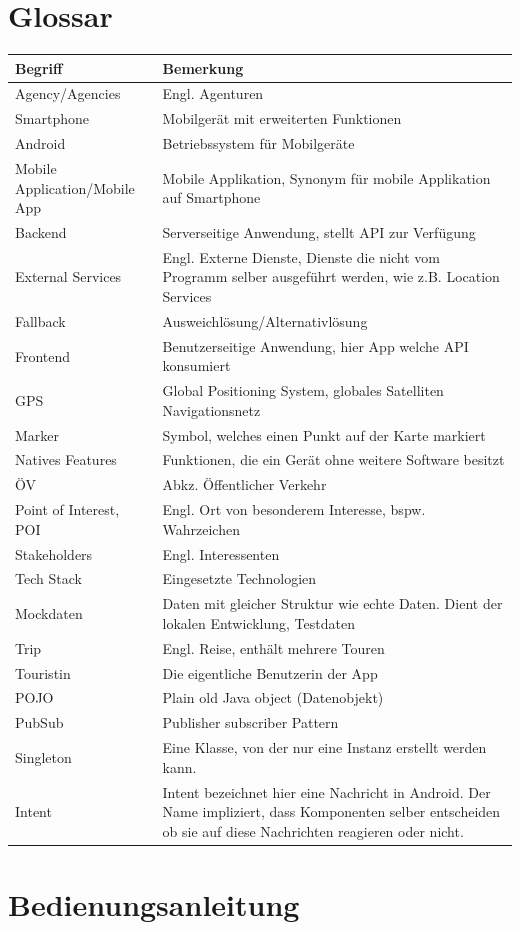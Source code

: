 \documentclass[a4paper,10pt,xetex]{article}
\begin{document}
\section{Glossar}\label{glossar}
\begin{longtabu} to \textwidth { | l | X[l] | }
\hline
\textbf{Begriff} & \textbf{Bemerkung}\\\hline
\endhead

Agency/Agencies & Engl. Agenturen\\\hline
Smartphone & Mobilgerät mit erweiterten Funktionen\\\hline
Android & Betriebssystem für Mobilgeräte\\\hline
Mobile Application/Mobile App & Mobile Applikation, Synonym für mobile Applikation auf Smartphone\\\hline
Backend & Serverseitige Anwendung, stellt API zur Verfügung\\\hline
External Services & Engl. Externe Dienste, Dienste die nicht vom Programm selber ausgeführt werden, wie z.B. Location Services\\\hline
Fallback & Ausweichlösung/Alternativlösung\\\hline
Frontend & Benutzerseitige Anwendung, hier App welche API konsumiert\\\hline
GPS & Global Positioning System, globales Satelliten Navigationsnetz\\\hline
Marker & Symbol, welches einen Punkt auf der Karte markiert\\\hline
Natives Features & Funktionen, die ein Gerät ohne weitere Software besitzt\\\hline
ÖV & Abkz. Öffentlicher Verkehr\\\hline
Point of Interest, POI & Engl. Ort von besonderem Interesse, bspw. Wahrzeichen\\\hline
Stakeholders & Engl. Interessenten\\\hline
Tech Stack & Eingesetzte Technologien\\\hline
Mockdaten & Daten mit gleicher Struktur wie echte Daten. Dient der lokalen Entwicklung, Testdaten \\\hline
Trip & Engl. Reise, enthält mehrere Touren\\\hline
Touristin & Die eigentliche Benutzerin der App\\\hline
POJO & Plain old Java object (Datenobjekt)\\\hline
PubSub & Publisher subscriber Pattern\\\hline
Singleton & Eine Klasse, von der nur eine Instanz erstellt werden kann.\\\hline
Intent & Intent bezeichnet hier eine Nachricht in Android. Der Name impliziert, dass Komponenten selber entscheiden ob sie auf diese Nachrichten reagieren oder nicht.\\\hline
\end{longtabu}


\section{Bedienungsanleitung}
\end{document}
